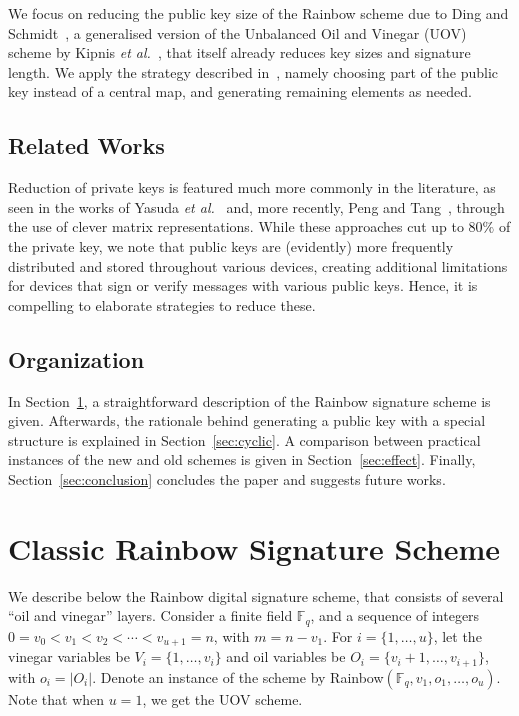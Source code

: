 \documentclass[11pt]{article}
\begin{document}
We focus on reducing the public key size of the Rainbow scheme due to Ding and
Schmidt~\cite{Ding:inproc:2005:jun}, a generalised version of the Unbalanced
Oil and Vinegar (UOV) scheme by Kipnis \emph{et
al.}~\cite{Kipnis:inproc:1999:apr}, that itself already reduces key sizes and
signature length. We apply the strategy described in~\cite[Chapter
7]{Petzoldt:phd:2013:jul}, namely choosing part of the public key instead of a
central map, and generating remaining elements as needed.

\subsection{Related Works}

Reduction of private keys is featured much more commonly in the literature, as
seen in the works of Yasuda \emph{et al.}~\cite{Yasuda:inproc:2013:may,
Yasuda:inproc:2014:apr, Yasuda:article:2014:sep} and, more recently, Peng and
Tang~\cite{Peng:article:2017:jun}, through the use of clever matrix
representations. While these approaches cut up to $80\%$ of the private key, we
note that public keys are (evidently) more frequently distributed and stored
throughout various devices, creating additional limitations for devices that
sign or verify messages with various public keys. Hence, it is compelling to
elaborate strategies to reduce these.

\subsection{Organization}

In Section~\ref{sec:rainbow}, a straightforward description of the Rainbow
signature scheme is given. Afterwards, the rationale behind generating a public
key with a special structure is explained in Section~\ref{sec:cyclic}. A
comparison between practical instances of the new and old schemes is given in
Section~\ref{sec:effect}. Finally, Section~\ref{sec:conclusion} concludes the
paper and suggests future works.

\section{Classic Rainbow Signature Scheme}\label{sec:rainbow}

We describe below the Rainbow digital signature scheme, that consists of
several ``oil and vinegar'' layers. Consider a finite field $\mathbb{F}_{q}$,
and a sequence of integers $0 = v_{0} < v_{1} < v_{2} < \cdots < v_{u+1} = n$,
with $m = n - v_{1}$. For $i = \{1, \dots, u\}$, let the vinegar variables be
$V_{i} = \{1, \dots, v_{i}\}$ and oil variables be
$O_{i} = \{v_{i} + 1, \dots, v_{i + 1}\}$, with $o_{i} = |O_{i}|$. Denote an
instance of the scheme by
Rainbow$(\mathbb{F}_{q}, v_{1}, o_{1}, \dots, o_{u})$. Note that when $u = 1$,
we get the UOV scheme.
\end{document}
